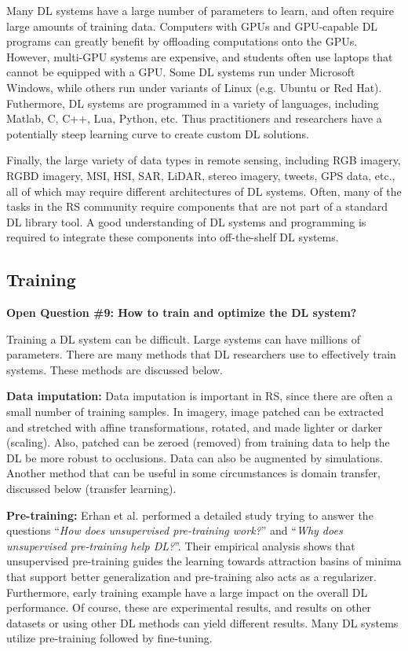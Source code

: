 \documentclass[12pt]{spieman}
\begin{document}
\begin{spacing}{1}
Many DL systems have a large number of parameters to learn, and often require large amounts of training data. Computers with GPUs and GPU-capable DL programs can greatly benefit by offloading computations onto the GPUs. However, multi-GPU systems are expensive, and students often use laptops that cannot be equipped with a GPU. Some DL systems run under Microsoft Windows, while others run under variants of Linux (e.g. Ubuntu or Red Hat). Futhermore, DL systems are programmed in a variety of languages, including Matlab, C, C++, Lua, Python, etc. Thus practitioners and researchers have a potentially steep learning curve to create custom DL solutions.

Finally, the large variety of data types in remote sensing, including RGB imagery, RGBD imagery, MSI, HSI, SAR, LiDAR, stereo imagery, tweets, GPS data, etc., all of which may require different architectures of DL systems. Often, many of the tasks in the RS community require components that are not part of a standard DL library tool. A good understanding of DL systems and programming is required to integrate these components into off-the-shelf DL systems.


\subsection{Training}
\label{subsec:ChallengesOpportunities_ix}
\textbf{Open Question \#9: How to train and optimize the DL system?}

Training a DL system can be difficult. Large systems can have millions of parameters. There are many methods that DL researchers use to effectively train systems. These methods are discussed below.

\textbf{Data imputation:} Data imputation \cite{hinton2006fast} is important in RS, since there are often a small number of training samples. In imagery, image patched can be extracted and stretched with affine transformations, rotated, and made lighter or darker (scaling). Also, patched can be zeroed (removed) from training data to help the DL be more robust to occlusions. Data can also be augmented by simulations. Another method that can be useful in some circumstances is domain transfer, discussed below (transfer learning).

\textbf{Pre-training:} Erhan et al. \cite{Erhan2010} performed a detailed study trying to answer the questions ``\textit{How does unsupervised pre-training work?}'' and ``\textit{Why does unsupervised pre-training help DL?}''. Their empirical analysis shows that unsupervised pre-training guides the learning towards attraction basins of minima that support better generalization and pre-training also acts as a regularizer. Furthermore, early training example have a large impact on the overall DL performance. Of course, these are experimental results, and results on other datasets or using other DL methods can yield different results. Many DL systems utilize pre-training followed by fine-tuning.


\end{spacing}
\end{document}
